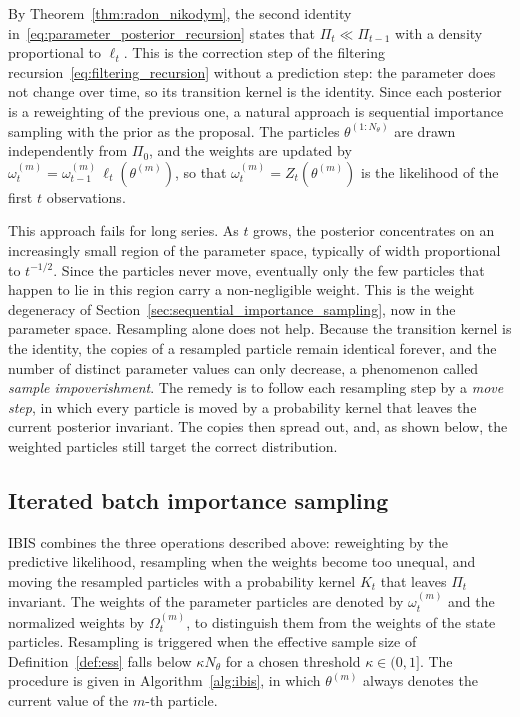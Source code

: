 By Theorem~\ref{thm:radon_nikodym}, the second identity in~\eqref{eq:parameter_posterior_recursion} states that $\Pi_t\ll\Pi_{t-1}$ with a density proportional to $\ell_t$. This is the correction step of the filtering recursion~\eqref{eq:filtering_recursion} without a prediction step: the parameter does not change over time, so its transition kernel is the identity. Since each posterior is a reweighting of the previous one, a natural approach is sequential importance sampling with the prior as the proposal. The particles $\theta^{(1:N_\theta)}$ are drawn independently from $\Pi_0$, and the weights are updated by $\omega_t^{(m)} = \omega_{t-1}^{(m)}\,\ell_t(\theta^{(m)})$, so that $\omega_t^{(m)} = Z_t(\theta^{(m)})$ is the likelihood of the first $t$ observations.

This approach fails for long series. As $t$ grows, the posterior concentrates on an increasingly small region of the parameter space, typically of width proportional to $t^{-1/2}$. Since the particles never move, eventually only the few particles that happen to lie in this region carry a non-negligible weight. This is the weight degeneracy of Section~\ref{sec:sequential_importance_sampling}, now in the parameter space. Resampling alone does not help. Because the transition kernel is the identity, the copies of a resampled particle remain identical forever, and the number of distinct parameter values can only decrease, a phenomenon called \emph{sample impoverishment}. The remedy is to follow each resampling step by a \emph{move step}, in which every particle is moved by a probability kernel that leaves the current posterior invariant. The copies then spread out, and, as shown below, the weighted particles still target the correct distribution.

\subsection{Iterated batch importance sampling}
\label{sec:ibis}
IBIS \cite{chopin2002sequential} combines the three operations described above: reweighting by the predictive likelihood, resampling when the weights become too unequal, and moving the resampled particles with a probability kernel $K_t$ that leaves $\Pi_t$ invariant. The weights of the parameter particles are denoted by $\omega_t^{(m)}$ and the normalized weights by $\Omega_t^{(m)}$, to distinguish them from the weights of the state particles. Resampling is triggered when the effective sample size of Definition~\ref{def:ess} falls below $\kappa N_\theta$ for a chosen threshold $\kappa\in(0,1]$. The procedure is given in Algorithm~\ref{alg:ibis}, in which $\theta^{(m)}$ always denotes the current value of the $m$-th particle.

